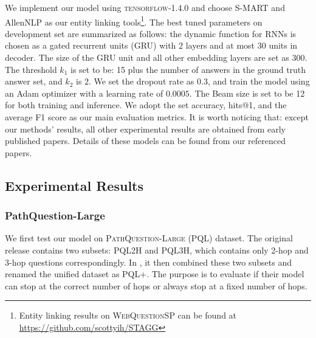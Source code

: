 We implement our model using \textsc{tensorflow-1.4.0} and choose S-MART \cite{DBLP:journals/corr/YangC16a} and AllenNLP \cite{Gardner2017AllenNLP} as our entity linking tools\footnote{Entity linking results on \textsc{WebQuestionSP} can be found at \url{https://github.com/scottyih/STAGG}}. The best tuned parameters on development set are summarized as follows: the dynamic function for RNNs is chosen as a gated recurrent units (GRU) with 2 layers and at most 30 units in decoder. The size of the GRU unit and all other embedding layers are set as 300. The threshold $k_1$ is set to be: 15 plus the number of answers in the ground truth answer set, and $k_2$ is 2. We set the dropout rate as 0.3, and train the model using an Adam optimizer with a learning rate of $0.0005$. The Beam size is set to be 12 for both training and inference. We adopt the set accuracy, hits@1, and the average F1 score as our main evaluation metrics. %
It is worth noticing that: except our methods' results, all other experimental results are obtained from early published papers. Details of these models can be found from our referenced papers.



\subsection{Experimental Results}
\subsubsection{PathQuestion-Large} 
We first test our model on \textsc{PathQuestion-Large} (PQL) dataset. The original release contains two subsets: PQL2H and PQL3H, which contains only 2-hop and 3-hop questions correspondingly. In \cite{DBLP:conf/naacl/ChenCCNK19}, it then combined these two subsets and renamed the unified dataset as PQL+. The purpose is to evaluate if their model can stop at the correct number of hops or always stop at a fixed number of hops.

